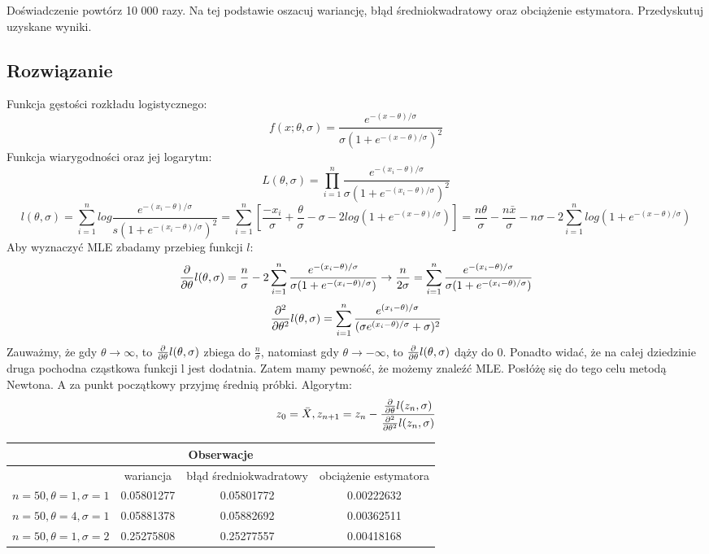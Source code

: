 \documentclass[a4paper]{article}
\begin{document}
Doświadczenie powtórz 10 000 razy. Na tej podstawie oszacuj wariancję, błąd średniokwadratowy oraz obciążenie estymatora. Przedyskutuj uzyskane wyniki.
\subsection{Rozwiązanie}
Funkcja gęstości rozkładu logistycznego:
$$f(x;\theta ,\sigma )=\frac {e^{-(x-\theta )/\sigma}}{\sigma(1+e^{-(x-\theta )/\sigma})^2}$$
Funkcja wiarygodności oraz jej logarytm:
$$L(\theta,\sigma)=\prod_{i=1}^n\frac {e^{-(x_i-\theta )/\sigma}}{\sigma(1+e^{-(x_i-\theta )/\sigma})^2}$$
$$l(\theta,\sigma)=\sum_{i=1}^nlog\frac {e^{-(x_i-\theta )/\sigma}}{s(1+e^{-(x_i-\theta )/\sigma})^2}=\sum_{i=1}^n[\frac{-x_i}{\sigma}+\frac{\theta}{\sigma}-\sigma-2log(1+e^{-(x-\theta )/\sigma})]=\frac{n\theta}{\sigma}-\frac{n\bar{x}}{\sigma}-n\sigma-2\sum_{i=1}^nlog(1+e^{-(x-\theta )/\sigma})$$
Aby wyznaczyć MLE zbadamy przebieg funkcji $l$:
$$\pdv{}{\theta} l(\theta,\sigma)=\frac{n}{\sigma}-2\sum_{i=1}^n\frac{e^{-(x_i-\theta)/\sigma}}{\sigma(1+e^{-(x_i-\theta)/\sigma})}\rightarrow\frac{n}{2\sigma}=\sum_{i=1}^n\frac{e^{-(x_i-\theta)/\sigma}}{\sigma(1+e^{-(x_i-\theta)/\sigma})}$$
$$\pdv{^2}{\theta^2} l(\theta,\sigma)=\sum_{i=1}^n\frac{e^{(x_i-\theta)/\sigma}}{(\sigma e^{(x_i-\theta)/\sigma}+\sigma)^2}$$
Zauważmy, że gdy $\theta\rightarrow\infty$, to $\pdv{}{\theta} l(\theta,\sigma)$ zbiega do $\frac{n}{\sigma}$, natomiast gdy $\theta\rightarrow-\infty$, to $\pdv{}{\theta} l(\theta,\sigma)$ dąży do 0. Ponadto widać, że na całej dziedzinie druga pochodna cząstkowa funkcji l jest dodatnia. Zatem mamy pewność, że możemy znaleźć MLE. Posłóżę się do tego celu metodą Newtona. A za punkt początkowy przyjmę średnią próbki. Algorytm:
$$z_0=\bar{X}, z_{n+1} = z_n - \frac{\pdv{}{\theta}l(z_n,\sigma)}{\pdv{^2}{\theta^2}l(z_n,\sigma)}$$

\begin{table}[H]
\centering
\begin{tabular}{|c|c|c|c|}
\hline
\multicolumn{4}{|c|}{\textbf{Obserwacje}}                                                       \\ \hline
         & wariancja           & błąd średniokwadratowy & obciążenie estymatora \\ \hline
$n=50,\theta=1,\sigma=1$ & 0.05801277 & 0.05801772 & 0.00222632 \\ \hline
$n=50,\theta=4,\sigma=1$  & 0.05881378 & 0.05882692 & 0.00362511 \\ \hline
$n=50,\theta=1,\sigma=2$  & 0.25275808 & 0.25277557 & 0.00418168 \\ \hline
\end{tabular}
\end{table}
\end{document}
